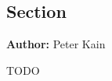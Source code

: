 \documentclass[../main.tex]{subfiles}
\begin{document}
\subsection{Section}

\vspace{2mm}

\textbf{Author:} Peter Kain

\vspace{2mm}
TODO
\end{document}
